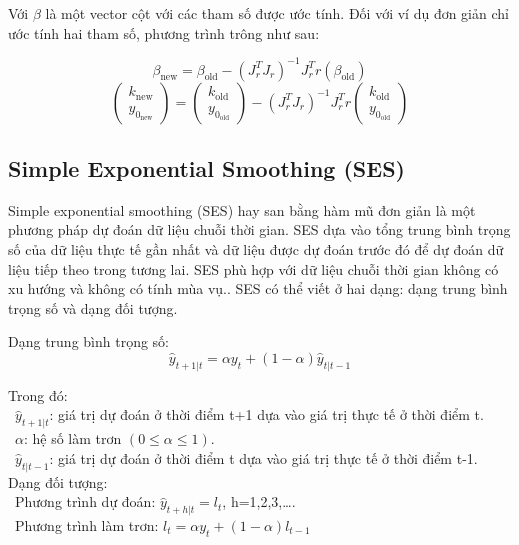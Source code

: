 \documentclass[conference]{IEEEtran}
\begin{document}
Với \(\beta\) là một vector cột với các tham số được ước tính. Đối với ví dụ đơn giản chỉ ước tính hai tham số, phương trình trông như sau:

\begin{center}
    \[
        \beta_{\text{new}} = \beta_{\text{old}} - (J^T_r J_r)^{-1} J^T_r r(\beta_{\text{old}})
    \]
    \[
        \begin{pmatrix}
            k_{\text{new}} \\ y_{0_\text{new}}
        \end{pmatrix} =
        \begin{pmatrix}
            k_{\text{old}} \\ y_{0_\text{old}}
        \end{pmatrix} - (J^T_r J_r)^{-1} J^T_r r \begin{pmatrix}
            k_{\text{old}} \\ y_{0_\text{old}}
        \end{pmatrix}
    \]
\end{center}
\vspace{3mm}


\subsection{Simple Exponential Smoothing (SES)}
Simple exponential smoothing (SES) hay san bằng hàm mũ đơn giản là một phương pháp dự đoán dữ liệu chuỗi thời gian. SES dựa vào tổng trung bình trọng số của dữ liệu thực tế gần nhất và dữ liệu được dự đoán trước đó để dự đoán dữ liệu tiếp theo trong tương lai. SES phù hợp với dữ liệu chuỗi thời gian không có xu hướng và không có tính mùa vụ.. SES có thể viết ở hai dạng: dạng trung bình trọng số và dạng đối tượng.

Dạng trung bình trọng số:
\[\hat{y}_{t+1|t} = \alpha y_t + (1-\alpha)\hat{y}_{t|t-1}\]

Trong đó:\\
\indent\textbullet\ \(\hat{y}_{t+1|t} \): giá trị dự đoán ở thời điểm t+1 dựa vào giá trị thực tế ở thời điểm t.\\
\indent\textbullet\ \(\alpha\): hệ số làm trơn \((0\le\alpha\le1)\).\\
\indent\textbullet\ \(\hat{y}_{t|t-1} \): giá trị dự đoán ở thời điểm t dựa vào giá trị thực tế ở thời điểm  t-1.\\

Dạng đối tượng:\\
\indent\textbullet\ Phương trình dự đoán: \(\hat{y}_{t+h|t}=l_t\), h=1,2,3,\dots.\\
\indent\textbullet\ Phương trình làm trơn: \(l_t=\alpha y_t+(1-\alpha)l_{t-1}\)\\
\end{document}
